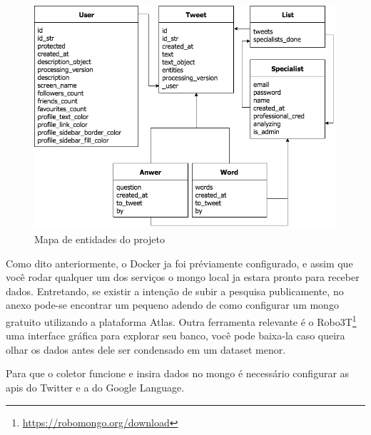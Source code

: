 \begin{figure}
    \centering
    \includegraphics[width=.8\textwidth]{imagens/entities.png}
    \caption{Mapa de entidades do projeto}
    \label{fig:entities}
\end{figure}

Como dito anteriormente, o Docker ja foi préviamente configurado, e assim que você rodar qualquer um dos serviços o mongo local ja estara pronto para receber dados. Entretando, se existir a intenção de subir a pesquisa publicamente, no anexo pode-se encontrar um pequeno adendo de como configurar um mongo gratuito utilizando a plataforma Atlas. Outra ferramenta relevante é o Robo3T\footnote{\url{https://robomongo.org/download}} uma interface gráfica para explorar seu banco, você pode baixa-la caso queira olhar os dados antes dele ser condensado em um dataset menor.

Para que o coletor funcione e insira dados no mongo é necessário configurar as apis do Twitter e a do Google Language.